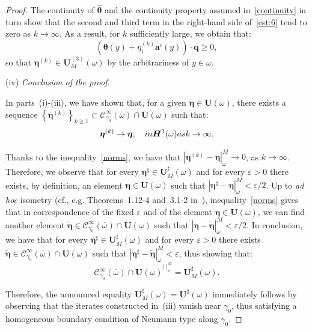 \documentclass{amsart}
\begin{document}
\begin{proof}
	The continuity of $\hat{\bm{\theta}}$ and the continuity property assumed in~\eqref{continuity} in turn show that the second and third term in the right-hand side of~\eqref{est:6} tend to zero as $k\to\infty$. As a result, for $k$ sufficiently large, we obtain that:
	\begin{equation*}
		\left(\bm{\theta}(y)+\eta_i^{(k)}\bm{a}^i(y)\right)\cdot\bm{q}\ge 0,
	\end{equation*}
	so that $\bm{\eta}^{(k)} \in \bm{U}_M^{(3)}(\omega)$ by the arbitrariness of $y\in\omega$.
	
	(iv) \emph{Conclusion of the proof.}
	
	In parts~(i)-(iii), we have shown that, for a given $\bm{\eta}\in \bm{U}(\omega)$, there exists a sequence $\left\{\bm{\eta}^{(k)}\right\}_{k\ge 1} \subset \bm{\mathcal{C}}^\infty_{\gamma_0}(\overline{\omega}) \cap\bm{U}(\omega)$ such that:
	\begin{equation*}
		\bm{\eta}^{(k)} \to \bm{\eta},\quad\textup{ in }\bm{H}^1(\omega) \textup{ as }k\to\infty.
	\end{equation*}
	
	Thanks to the inequality~\eqref{norms}, we have that $\left|\bm{\eta}^{(k)}-\bm{\eta}\right|_\omega^M \to 0$, as $k\to\infty$.
	Therefore, we observe that for every $\bm{\eta}^\sharp \in \bm{U}_M^\sharp(\omega)$ and for every $\varepsilon>0$ there exists, by definition, an element $\bm{\eta}\in \bm{U}(\omega)$ such that $|\bm{\eta}^\sharp-\bm{\eta}|_\omega^M <\varepsilon/2$. Up to \emph{ad hoc} isometry (cf., e.g. Theorems~1.12-4 and~3.1-2 in~\cite{Ciarlet2025}), inequality~\eqref{norms} gives that in correspondence of the fixed $\varepsilon$ and of the element $\bm{\eta}\in\bm{U}(\omega)$, we can find another element $\tilde{\bm{\eta}}\in \bm{\mathcal{C}}^\infty_{\gamma_0}(\overline{\omega}) \cap \bm{U}(\omega)$ such that $|\bm{\eta}-\tilde{\bm{\eta}}|_\omega^M <\varepsilon/2$. In conclusion, we have that for every $\bm{\eta}^\sharp \in \bm{U}_M^\sharp(\omega)$ and for every $\varepsilon>0$ there exists $\tilde{\bm{\eta}}\in \bm{\mathcal{C}}^\infty_{\gamma_0}(\overline{\omega}) \cap \bm{U}(\omega)$ such that $|\bm{\eta}^\sharp-\tilde{\bm{\eta}}|_\omega^M <\varepsilon$, thus showing that:
	\begin{equation*}
		\overline{\bm{\mathcal{C}}^\infty_{\gamma_0}(\overline{\omega}) \cap \bm{U}(\omega)}^{|\cdot|_\omega^M}=\bm{U}_M^\sharp(\omega).
	\end{equation*}
	
	Therefore, the announced equality $\bm{U}_M^\sharp(\omega)=\bm{U}^\sharp(\omega)$ immediately follows by observing that the iterates constructed in~(iii) vanish near $\gamma_0$, thus satisfying a homogeneous boundary condition of Neumann type along $\gamma_0$.
\end{proof}
\end{document}
